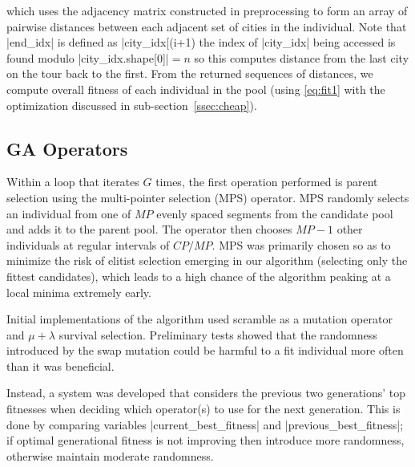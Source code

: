 {\small}

\noindent which uses the adjacency matrix constructed in preprocessing to form 
an array of pairwise distances between each adjacent set of cities in the 
individual. Note that |end_idx| is defined as |city_idx[(i+1) %
\ie the index of |city_idx| being accessed is found modulo 
|city_idx.shape[0]|${} = n$ so this computes distance from the last city on the 
tour back to the first. From the returned sequences of distances, we 
compute overall fitness of each individual in the pool (using \eqref{eq:fit1}
with the optimization discussed in sub-section~\ref{ssec:cheap}).

\subsection{GA Operators}
Within a loop that iterates $G$ times, the first operation performed is parent
selection using the multi-pointer selection (MPS) operator. MPS randomly 
selects an individual from one of $MP$ evenly spaced segments from the 
candidate pool and adds it to the parent pool. The operator then chooses
$MP-1$ other individuals at regular intervals of $CP/MP$. MPS was primarily 
chosen so as to minimize the risk of elitist selection emerging in our 
algorithm (\ie selecting only the fittest candidates), which leads to a 
high chance of the algorithm peaking at a local minima extremely early.


Initial implementations of the algorithm used scramble as a mutation operator
and $\mu + \lambda$ survival selection. Preliminary tests showed that the 
randomness introduced by the swap mutation could be harmful to a fit 
individual more often than it was beneficial.  

Instead, a system was developed that considers the previous two generations'
top fitnesses when deciding which operator(s) to use for the next generation.
This is done by comparing variables |current_best_fitness| and 
|previous_best_fitness|; if optimal generational fitness is not improving
then introduce more randomness, otherwise maintain moderate randomness.

